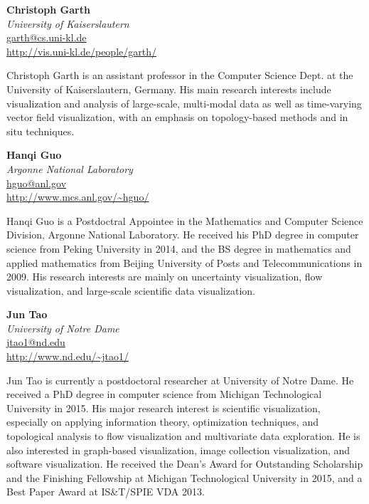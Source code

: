 \documentclass[preprint,journal]{vgtc}       %
\newcommand{\addverticalspace}{\vspace{3mm}}
\begin{document}
\addverticalspace

\noindent \textbf{Christoph Garth}\\
\emph{University of Kaiserslautern}\\
\href{mailto:garth@cs.uni-kl.de}{garth@cs.uni-kl.de}\\
\url{http://vis.uni-kl.de/people/garth/}

\addverticalspace

Christoph Garth is an assistant professor in the Computer Science Dept. at the University of Kaiserslautern, Germany. His main research interests include visualization and analysis of large-scale, multi-modal data as well as time-varying vector field visualization, with an emphasis on topology-based methods and in situ techniques.

\printbibliography[title={Relevant Publications},category=Garth]

\noindent \textbf{Hanqi Guo}\\
\emph{Argonne National Laboratory}\\
\href{mailto:hguo@anl.gov}{hguo@anl.gov}\\
\url{http://www.mcs.anl.gov/~hguo/}

\addverticalspace

Hanqi Guo is a Postdoctral Appointee in the Mathematics and Computer Science Division, Argonne National Laboratory. He received his PhD degree in computer science from Peking University in 2014, and the BS degree in mathematics and applied mathematics from Beijing University of Posts and Telecommunications in 2009. His research interests are mainly on uncertainty visualization, flow visualization, and large-scale scientific data visualization.

\printbibliography[title={Relevant Publications},category=Guo]

\noindent \textbf{Jun Tao}\\
\emph{University of Notre Dame}\\
\href{mailto:jtao1@nd.edu}{jtao1@nd.edu}\\
\url{http://www.nd.edu/~jtao1/}

\addverticalspace

Jun Tao is currently a postdoctoral researcher at University of Notre Dame. He received a PhD degree in computer science from Michigan Technological University in 2015. His major research interest is scientific visualization, especially on applying information theory, optimization techniques, and topological analysis to flow visualization and multivariate data exploration. He is also interested in graph-based visualization, image collection visualization, and software visualization. He received the Dean’s Award for Outstanding Scholarship and the Finishing Fellowship at Michigan Technological University in 2015, and a Best Paper Award at IS\&T/SPIE VDA 2013.
\end{document}
